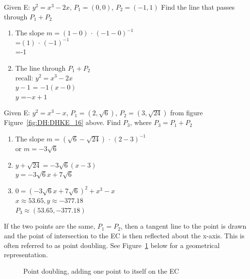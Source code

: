 \begin{eg} Given E: $y^2 = x^3 - 2x$, $P_1 = (0,0)$, $P_2 = (-1,1)$
	Find the line that passes through $P_1 + P_2$
		\begin{enumerate}[(1)] 
	\item The slope $m =(1 - 0)$ $\cdot$ $(-1- 0)^{-1}$ \\
		\text{ \qquad \: \: \:} =$(1)$ $\cdot$ $(-1)^{-1}$ \\
		\text{ \qquad \: \: \:} =-1 
	\item The line through $P_1 + P_2$ \\
		\text{ \qquad \: \:} recall: $y^2 = x^3 - 2x$ \\
		\text{ \qquad \: \:} $y - 1$ = $-1(x- 0)$ \\
		\text{ \qquad \: \:} $y$ =$-x + 1$ 
\end {enumerate} 
\end{eg}

\begin{eg} Given E: $y^2 = x^3 - x$, $P_1 = (2, \sqrt{6})$, $P_2 = (3, \sqrt{24})$ from figure Figure~\ref{fig:DH:DHKE_16} above.
	Find $P_3$, where $P_3 = P_1 + P_2$
		\begin{enumerate}[(1)] 
	\item The slope $m =(\sqrt{6} - \sqrt{24})$ $\cdot$ $(2- 3)^{-1}$ \\
		\text{ \qquad \: \:} or $m = -3\sqrt{6}$ 
	\item $y + \sqrt{24} = -3\sqrt{6}(x - 3)$ \\
		$y = -3\sqrt{6}x + 7\sqrt{6}$
	\item $0 = (-3\sqrt{6}x + 7\sqrt{6})^2 + x^3 - x$\\
		$x \approx 53.65, y \approx -377.18$\\
		$P_3 \approx (53.65, -377.18)$
\end {enumerate}  
\end{eg}

If the two points are the same, $P_1 = P_2$, then a tangent line to the point is drawn and the point of intersection to the EC is then reflected about the x-axis.  This is often referred to as point doubling. See Figure~\ref{fig:DH:DHKE_7} below for a geometrical representation.
\begin{figure}[H]
	  \caption{\label{fig:DH:DHKE_7} Point doubling, adding one point to itself on the EC}
\end{figure}
